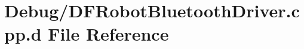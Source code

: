 \hypertarget{_debug_2_d_f_robot_bluetooth_driver_8cpp_8d}{\section{\-Debug/\-D\-F\-Robot\-Bluetooth\-Driver.cpp.\-d \-File \-Reference}
\label{_debug_2_d_f_robot_bluetooth_driver_8cpp_8d}
}
